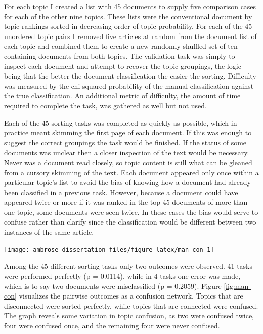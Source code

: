 \documentclass[]{book}
\theoremstyle{definition}
\theoremstyle{definition}
\theoremstyle{definition}
\theoremstyle{remark}
\begin{document}
For each topic I created a list with 45 documents to supply five
comparison cases for each of the other nine topics. These lists were the
conventional document by topic rankings sorted in decreasing order of
topic probability. For each of the 45 unordered topic pairs I removed
five articles at random from the document list of each topic and
combined them to create a new randomly shuffled set of ten containing
documents from both topics. The validation task was simply to inspect
each document and attempt to recover the topic groupings, the logic
being that the better the document classification the easier the
sorting. Difficulty was measured by the chi squared probability of the
manual classification against the true classification. An additional
metric of difficulty, the amount of time required to complete the task,
was gathered as well but not used.

Each of the 45 sorting tasks was completed as quickly as possible, which
in practice meant skimming the first page of each document. If this was
enough to suggest the correct groupings the task would be finished. If
the status of some documents was unclear then a closer inspection of the
text would be necessary. Never was a document read closely, so topic
content is still what can be gleaned from a cursory skimming of the
text. Each document appeared only once within a particular topic's list
to avoid the bias of knowing how a document had already been classified
in a previous task. However, because a document could have appeared
twice or more if it was ranked in the top 45 documents of more than one
topic, some documents were seen twice. In these cases the bias would
serve to confuse rather than clarify since the classification would be
different between two instances of the same article.

\begin{center}\texttt{[image: ambrose\_dissertation\_files/figure-latex/man-con-1]} \end{center}

Among the 45 different sorting tasks only two outcomes were observed. 41
tasks were performed perfectly (p = 0.0114), while in 4 tasks one error
was made, which is to say two documents were misclassified (p = 0.2059).
Figure \ref{fig:man-con} visualizes the pairwise outcomes as a confusion
network. Topics that are disconnected were sorted perfectly, while
topics that are connected were confused. The graph reveals some
variation in topic confusion, as two were confused twice, four were
confused once, and the remaining four were never confused.
\end{document}
